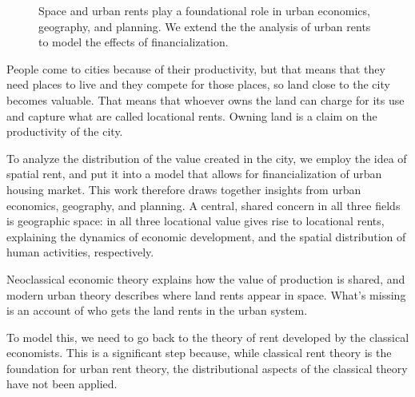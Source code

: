\begin{figure}[!ht]
\caption[Linking space and urban rents to the effects of financialization.]{Space and urban rents play a foundational role in urban economics, geography, and planning. We extend the the analysis of urban rents to model the effects of financialization.}
\label{fig-fields}
\end{figure}

People come to cities because of their productivity, but that means that they need places to live and they compete for those places, so land close to the city becomes valuable. That means that whoever owns the land can charge for its use and capture what are called \glspl{locational rent}. Owning land is a claim on the productivity of the city. 

To analyze the distribution of the value created in the city, we employ the idea of spatial rent, and put it into a model that allows for financialization of urban housing market. This work therefore draws together insights from urban economics, geography, and planning. A central, shared concern in all three fields is geographic space: in all three locational value gives rise to locational rents,  explaining the dynamics of economic development, and the spatial distribution of human activities,  respectively. 

Neoclassical economic theory explains how the value of production is shared, and
modern urban theory describes where land rents appear in space. What's missing is an account of who gets the land rents in the urban system. 

To model this, we need to go back to the theory of rent developed by the classical economists. This is a significant step because, while classical rent theory is the foundation for urban rent theory, the distributional aspects of the classical theory have not been applied.

